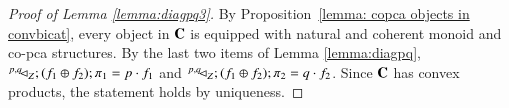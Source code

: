 \begin{proof}[Proof of Lemma \ref{lemma:diagpq3}]
By Proposition~\ref{lemma: copca objects in convbicat}, every object in $\mathbf{C}$ is equipped with natural and coherent monoid and co-pca structures. By the last two items of Lemma \ref{lemma:diagpq}, $^{p,q\,}\!\! \lhd_{Z};(f_1\oplus f_2); \pi_1= p\cdot f_1$ and $^{p,q\,}\!\! \lhd_{Z};(f_1\oplus f_2); \pi_2= q\cdot f_2$. Since $\mathbf{C}$ has convex products, the statement holds by uniqueness.
\end{proof}

